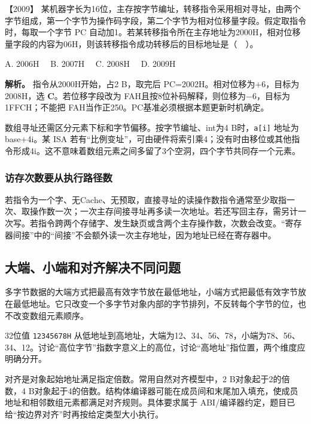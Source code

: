 \noindent{}【2009】 某机器字长为16位，主存按字节编址，转移指令采用相对寻址，由两个字节组成，第一个字节为操作码字段，第二个字节为相对位移量字段。假定取指令时，每取一个字节 PC 自动加1。若某转移指令所在主存地址为2000H，相对位移量字段的内容为06H，则该转移指令成功转移后的目标地址是（　）。

A. 2006H　 B. 2007H　 C. 2008H　 D. 2009H


\textbf{解析。} 指令从2000H开始，占2 B，取完后 PC=2002H。相对位移为+6，目标为2008H，选 \textbf{C}。若位移字段改为 FAH且按8位补码解释，则位移为−6，目标为1FFCH；不能把 FAH当作正250。PC基准必须根据本题更新时机确定。

数组寻址还需区分元素下标和字节偏移。按字节编址、int为4 B时，\texttt{a{[}i{]}} 地址为base+4i。某 ISA 若有``比例变址''，可由硬件将索引乘4；没有时由移位或其他指令形成4i。这不意味着数组元素之间多留了3个空洞，四个字节共同存一个元素。

\subsubsection{访存次数要从执行路径数}\label{ux8bbfux5b58ux6b21ux6570ux8981ux4eceux6267ux884cux8defux5f84ux6570}

若指令为一个字、无Cache、无预取，直接寻址的读操作数指令通常至少取指一次、取操作数一次；一次主存间接寻址再多读一次地址。若还写回主存，需另计一次写。若指令跨两个存储字、发生缺页或含两个主存操作数，次数会改变。``寄存器间接''中的``间接''不会额外读一次主存地址，因为地址已经在寄存器中。

\subsection{大端、小端和对齐解决不同问题}\label{co-04-03}

多字节数据的大端方式把最高有效字节放在最低地址，小端方式把最低有效字节放在最低地址。它只改变一个多字节对象内部的字节排列，不反转每个字节的位，也不改变数组元素顺序。

32位值 \texttt{12345678H} 从低地址到高地址，大端为12、34、56、78，小端为78、56、34、12。讨论``高位字节''指数字意义上的高位，讨论``高地址''指位置，两个维度应明确分开。

对齐是对象起始地址满足指定倍数。常用自然对齐模型中，2 B对象起于2的倍数，4 B对象起于4的倍数。结构体编译器可能在成员间和末尾加入填充，使成员地址和相邻数组元素都满足对齐规则。具体要求属于 ABI/编译器约定，题目已给``按边界对齐''时再按给定类型大小执行。

